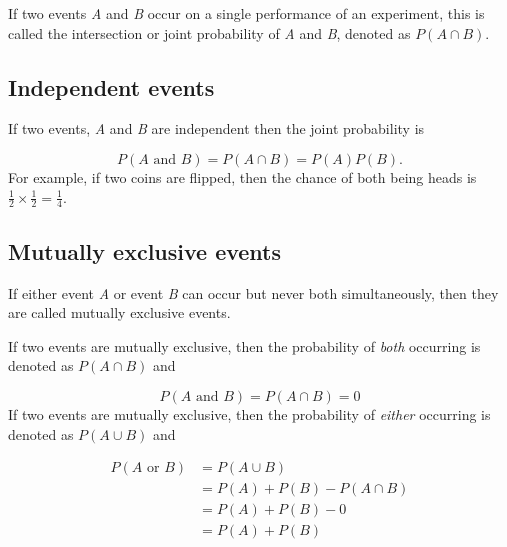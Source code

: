 If two events \textit{A} and \textit{B} occur on a single performance of an experiment,
this is called the intersection or joint probability of \textit{A} and \textit{B}, denoted
as $P(A \cap B)$.




\subsection{Independent events}
\label{sss:inde-adc5}




If two events, \textit{A} and \textit{B} are independent then the joint probability is



$$P(A \text{ and }B) =  P(A \cap B) = P(A) P(B).$$ For example, if two coins are flipped,
then the chance of both being heads is $\tfrac{1}{2}\times\tfrac{1}{2} = \tfrac{1}{4}$.




\subsection{Mutually exclusive events}
\label{sss:mutu-be52}




If either event \textit{A} or event \textit{B} can occur but never both simultaneously,
then they are called mutually exclusive events.



If two events are mutually exclusive, then the probability of \textit{both} occurring is
denoted as $P(A \cap B)$ and



$$P(A \text{ and }B) =  P(A \cap B) = 0$$ If two events are mutually exclusive, then the
probability of \textit{either} occurring is denoted as $P(A \cup B)$ and



\begin{align} P(A\text{ or }B) & = P(A \cup B) \\ & = P(A) + P(B) - P(A \cap B) \\ & = P(A) + P(B) - 0 \\ & = P(A) + P(B) \end{align}



